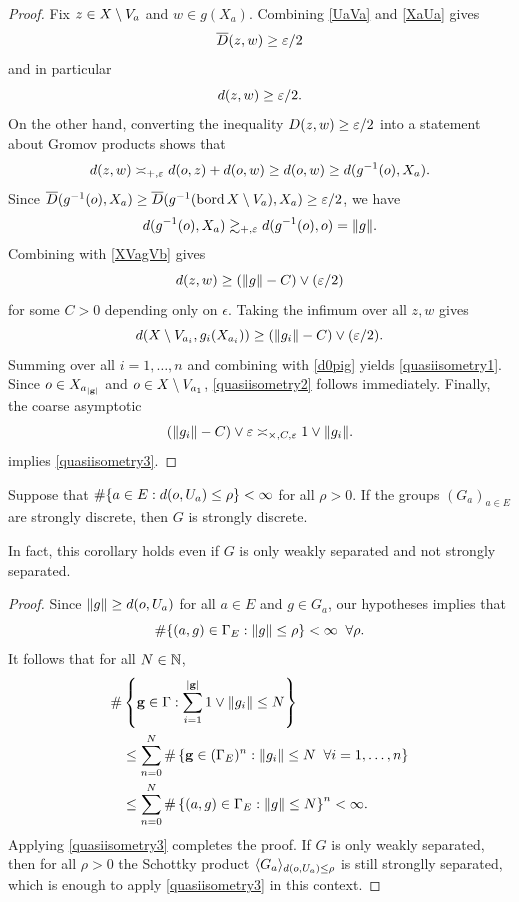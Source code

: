 \begin{proof}
Fix $z\in X\setminus V_a$ and $w\in g(X_a)$. Combining \eqref{UaVa} and \eqref{XaUa} gives
\[
\overline{D}(z,w) \geq \varepsilon/2
\]
and in particular
\begin{equation}
\label{XVagVb}
d(z,w) \geq \varepsilon/2.
\end{equation}
On the other hand, converting the inequality $D(z,w) \geq \varepsilon/2$ into a statement about Gromov products shows that
\[
d(z,w) \asymp_{+,\varepsilon} d(o,z) + d(o,w) \geq d(o,w) \geq d(g^{-1}(o),X_a).
\]
Since $\overline{D}(g^{-1}(o),X_a) \geq \overline{D}(g^{-1}(\operatorname{bord} X\setminus V_a),X_a) \geq \varepsilon/2$, we have
\[
d(g^{-1}(o),X_a) \gtrsim_{+,\varepsilon} d(g^{-1}(o),o) = \|g\|.
\]
Combining with \eqref{XVagVb} gives
\[
d(z,w) \geq (\|g\| - C) \vee (\varepsilon/2)
\]
for some $C > 0$ depending only on $\epsilon$. Taking the infimum over all $z,w$ gives
\[
d(X\setminus V_{a_i}, g_i(X_{a_i})) \geq (\|g_i\| - C) \vee (\varepsilon/2).
\]
Summing over all $i = 1,\ldots,n$ and combining with \eqref{d0pig} yields \eqref{quasiisometry1}. Since $o\in X_{a_{|\mathbf g|}}$ and $o\in X\setminus V_{a_1}$, \eqref{quasiisometry2} follows immediately. Finally, the coarse asymptotic
\[
(\|g_i\| - C)\vee \varepsilon \asymp_{\times,C,\varepsilon} 1\vee \|g_i\|.
\]
implies \eqref{quasiisometry3}.
\end{proof}

\begin{corollary}
\label{corollaryschottkySD}
Suppose that $\#\{a\in E : d(o,U_a) \leq \rho\} < \infty$ for all $\rho > 0$. If the groups $(G_a)_{a\in E}$ are strongly discrete, then $G$ is strongly discrete.

In fact, this corollary holds even if $G$ is only weakly separated and not strongly separated.
\end{corollary}
\begin{proof}
Since $\|g\| \geq d(o,U_a)$ for all $a\in E$ and $g\in G_a$, our hypotheses implies that
\[
\#\{(a,g)\in \Gamma_E : \|g\| \leq \rho\} < \infty \;\;\forall \rho.
\]
It follows that for all $N\in\N$,
\begin{equation}
\label{Gamman}
\begin{split}
\#&\left\{\mathbf g\in\Gamma : \sum_{i = 1}^{|\mathbf g|} 1\vee\|g_i\| \leq N\right\}\\
&\leq \sum_{n = 0}^N \#\left\{\mathbf g\in (\Gamma_E)^n : \|g_i\| \leq N \;\;\forall i = 1,\ldots,n\right\}\\
&\leq \sum_{n = 0}^N \#\left\{(a,g)\in\Gamma_E : \|g\| \leq N\right\}^n
< \infty.
\end{split}
\end{equation}
Applying \eqref{quasiisometry3} completes the proof. If $G$ is only weakly separated, then for all $\rho > 0$ the Schottky product $\langle G_a\rangle_{d(o,U_a)\leq \rho}$ is still stronglly separated, which is enough to apply \eqref{quasiisometry3} in this context.
\end{proof}


